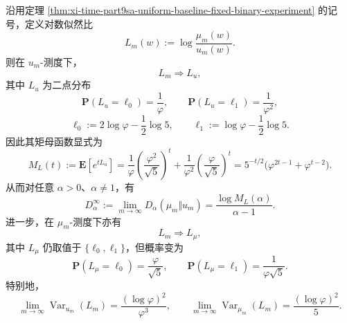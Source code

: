 \begin{theorem}[原始切片对数似然比的极限二点律与全阶累积母函数]\label{thm:xi-time-part9xe-loglikelihood-two-point-cgf}
沿用定理 \ref{thm:xi-time-part9sa-uniform-baseline-fixed-binary-experiment} 的记号，定义对数似然比
\[
L_m(w):=\log\frac{\mu_m(w)}{u_m(w)}.
\]
则在 \(u_m\)-测度下，
\[
L_m\Longrightarrow L_u,
\]
其中 \(L_u\) 为二点分布
\[
\mathbf P(L_u=\ell_0)=\frac1\varphi,
\qquad
\mathbf P(L_u=\ell_1)=\frac1{\varphi^2},
\]
\[
\ell_0:=2\log\varphi-\frac12\log 5,
\qquad
\ell_1:=\log\varphi-\frac12\log 5.
\]
因此其矩母函数显式为
\[
M_L(t):=\mathbf E\!\left[e^{tL_u}\right]
=
\frac1\varphi\left(\frac{\varphi^2}{\sqrt5}\right)^t
+\frac1{\varphi^2}\left(\frac{\varphi}{\sqrt5}\right)^t
=
5^{-t/2}\bigl(\varphi^{2t-1}+\varphi^{t-2}\bigr).
\]
从而对任意 \(\alpha>0\)、\(\alpha\neq 1\)，有
\[
D_\alpha^\infty
:=
\lim_{m\to\infty}D_\alpha(\mu_m\Vert u_m)
=
\frac{\log M_L(\alpha)}{\alpha-1}.
\]
进一步，在 \(\mu_m\)-测度下亦有
\[
L_m\Longrightarrow L_\mu,
\]
其中 \(L_\mu\) 仍取值于 \(\{\ell_0,\ell_1\}\)，但概率变为
\[
\mathbf P(L_\mu=\ell_0)=\frac{\varphi}{\sqrt5},
\qquad
\mathbf P(L_\mu=\ell_1)=\frac{1}{\varphi\sqrt5}.
\]
特别地，
\[
\lim_{m\to\infty}\operatorname{Var}_{u_m}(L_m)
=
\frac{(\log\varphi)^2}{\varphi^3},
\qquad
\lim_{m\to\infty}\operatorname{Var}_{\mu_m}(L_m)
=
\frac{(\log\varphi)^2}{5}.
\]
\end{theorem}
